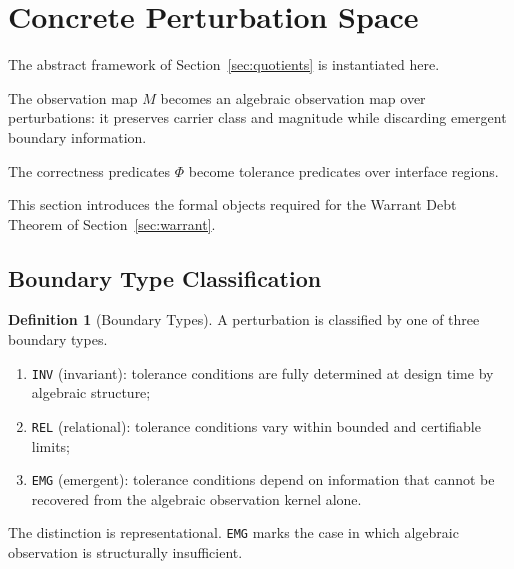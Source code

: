 \documentclass[pdflatex,sn-mathphys-num]{sn-jnl}
\theoremstyle{plain}
\theoremstyle{definition}
\newtheorem{definition}[theorem]{Definition}
\theoremstyle{remark}
\begin{document}
\section{Concrete Perturbation Space}
\label{sec:perturbations}

The abstract framework of Section~\ref{sec:quotients} is instantiated
here.

The observation map $M$ becomes an algebraic observation map over
perturbations: it preserves carrier class and magnitude while
discarding emergent boundary information.

The correctness predicates $\Phi$ become tolerance predicates over
interface regions.

This section introduces the formal objects required for the Warrant
Debt Theorem of Section~\ref{sec:warrant}.

\subsection{Boundary Type Classification}

\begin{definition}[Boundary Types]

A perturbation is classified by one of three boundary types.

\begin{enumerate}[label=(\roman*),noitemsep]
    \item \texttt{INV} (invariant):
    tolerance conditions are fully determined at design time by
    algebraic structure;

    \item \texttt{REL} (relational):
    tolerance conditions vary within bounded and certifiable limits;

    \item \texttt{EMG} (emergent):
    tolerance conditions depend on information that cannot be
    recovered from the algebraic observation kernel alone.
\end{enumerate}

The distinction is representational.
\texttt{EMG} marks the case in which algebraic observation is
structurally insufficient.

\end{definition}
\end{document}
